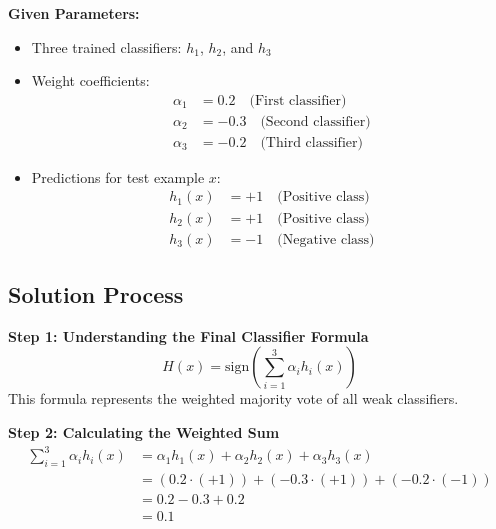 \documentclass{exam}
\begin{document}
\begin{important}
\textbf{Given Parameters:}
\begin{itemize}[leftmargin=*]
    \item Three trained classifiers: $h_1$, $h_2$, and $h_3$
    \item Weight coefficients:
        \begin{align*}
            \alpha_1 &= 0.2 \quad \text{(First classifier)}\\
            \alpha_2 &= -0.3 \quad \text{(Second classifier)}\\
            \alpha_3 &= -0.2 \quad \text{(Third classifier)}
        \end{align*}
    \item Predictions for test example $x$:
        \begin{align*}
            h_1(x) &= +1 \quad \text{(Positive class)}\\
            h_2(x) &= +1 \quad \text{(Positive class)}\\
            h_3(x) &= -1 \quad \text{(Negative class)}
        \end{align*}
\end{itemize}
\end{important}

\subsection*{Solution Process}

\begin{example}
\textbf{Step 1: Understanding the Final Classifier Formula}
\begin{equation*}
H(x) = \text{sign}\left(\sum_{i=1}^{3} \alpha_i h_i(x)\right)
\end{equation*}
This formula represents the weighted majority vote of all weak classifiers.
\end{example}

\begin{example}
\textbf{Step 2: Calculating the Weighted Sum}
\begin{align*}
\sum_{i=1}^{3} \alpha_i h_i(x) &= \alpha_1h_1(x) + \alpha_2h_2(x) + \alpha_3h_3(x)\\
&= (0.2 \cdot (+1)) + (-0.3 \cdot (+1)) + (-0.2 \cdot (-1))\\
&= 0.2 - 0.3 + 0.2\\
&= 0.1
\end{align*}
\end{example}
\end{document}
